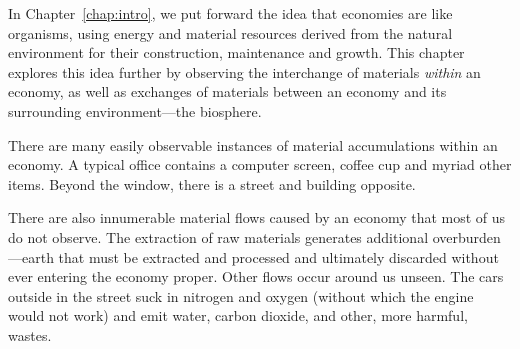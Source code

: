 
In Chapter~\ref{chap:intro}, we put forward the idea that 
economies are like organisms,
using energy and material resources 
derived from the natural environment
for their construction, maintenance and growth.
This chapter explores
this idea further by observing the interchange of materials \emph{within}
an economy, as well as exchanges of materials between an economy and 
its surrounding environment---the biosphere. 


 

There are many easily observable instances 
of material accumulations
within an economy. 
A typical office contains a computer screen, coffee cup
and myriad other items. 
Beyond the window, there is a street and building
opposite. 

There are also innumerable material flows caused by an economy 
that most of us do not observe.
The extraction of raw materials generates additional overburden---earth that must be
extracted and processed and ultimately discarded without ever entering the economy
proper. 
Other flows occur around us unseen. 
The cars outside in the street suck in nitrogen and oxygen 
(without which the engine would not work) 
and emit water, carbon dioxide, and
other, more harmful, wastes. 

